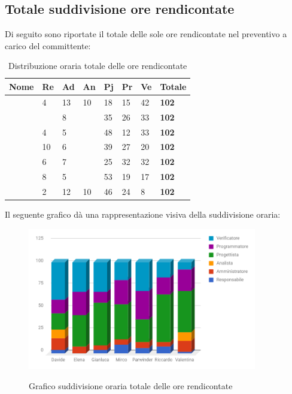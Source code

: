 \documentclass[PianoDiProgetto.tex]{subfiles}
\begin{document}
\subsection{Totale suddivisione ore rendicontate}
Di seguito sono riportate il totale delle sole ore rendicontate nel preventivo a carico del committente:
\begin{center}
	\begin{table}[htbp]
		\centering
		\renewcommand\arraystretch{1.5}
		\begin{tabularx}{\textwidth}{p{4cm}|p{1cm}|p{1cm}|p{1cm}|p{1cm}|p{1cm}|p{1cm}|p{2cm}}
			\hline
			\textbf{Nome} & \textbf{Re} & \textbf{Ad} & \textbf{An} & \textbf{Pj} & \textbf{Pr} & \textbf{Ve} & \textbf{Totale} \\
			\hline
			\Davide & 4 & 13 & 10 & 18 & 15 & 42 & \textbf{102} \\
			\hline
			\Elena & \ & 8 & \ & 35 & 26 & 33 & \textbf{102} \\
			\hline
			\Gianluca & 4 & 5 & \ & 48 & 12 & 33 & \textbf{102} \\
			\hline
			\Mirco & 10 & 6 & \ & 39 & 27 & 20 & \textbf{102} \\
			\hline
			\Parwinder & 6 & 7 & \ & 25 & 32 & 32 & \textbf{102} \\
			\hline
			\Riccardo & 8 & 5 & \ & 53 & 19 & 17 & \textbf{102} \\
			\hline
			\Valentina & 2 & 12 & 10 & 46 & 24 & 8 & \textbf{102} \\
			\hline
		\end{tabularx}
	\caption{Distribuzione oraria totale delle ore rendicontate}
	\label{my-label}
	\end{table}
	
\end{center}
Il seguente grafico dà una rappresentazione visiva della suddivisione oraria:\\
\begin{figure}[h]
	\centering
	\includegraphics[width=10cm]{images/prospettoOrario/totRen.png}
	\label{fig:foo}
	\caption{Grafico suddivisione oraria totale delle ore rendicontate}
\end{figure} 
\clearpage
\end{document}
